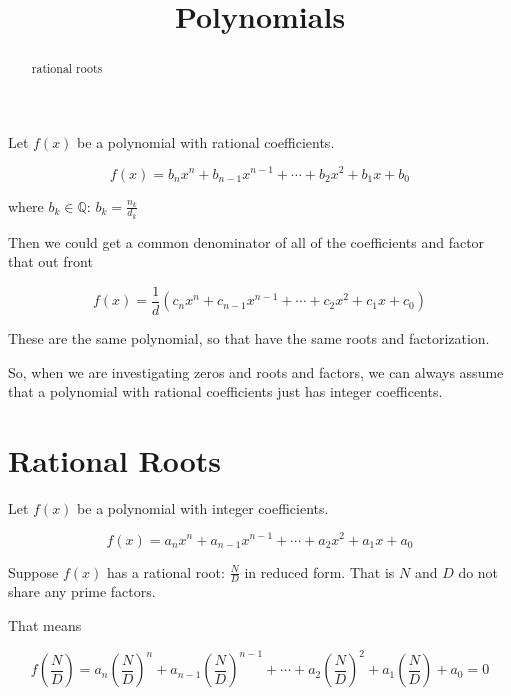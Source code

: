 \documentclass{ximera}
\title{Polynomials}
\begin{document}
\begin{abstract}
rational roots
\end{abstract}
\maketitle




Let $f(x)$ be a polynomial with rational coefficients.

\[   f(x) = b_n x^n + b_{n-1} x^{n-1} + \cdots + b_2 x^2 + b_1 x + b_0     \]


where $b_k \in \mathbb{Q}$:  $b_k = \frac{n_k}{d_k}$


Then we could get a common denominator of all of the coefficients and factor that out front



\[   f(x) = \frac{1}{d}(c_n x^n + c_{n-1} x^{n-1} + \cdots + c_2 x^2 + c_1 x + c_0)    \]


These are the same polynomial, so that have the same roots and factorization.


So, when we are investigating zeros and roots and factors, we can always assume that a polynomial with rational coefficients just has integer coefficents.




\section{Rational Roots}

Let $f(x)$ be a polynomial with integer coefficients.

\[   f(x) = a_n x^n + a_{n-1} x^{n-1} + \cdots + a_2 x^2 + a_1 x + a_0     \]


Suppose $f(x)$ has a rational root:  $\frac{N}{D}$ in reduced form.  That is $N$ and $D$ do not share any prime factors.



That means


\[    f \left( \frac{N}{D} \right) = a_n \left( \frac{N}{D} \right)^n + a_{n-1} \left( \frac{N}{D} \right)^{n-1} + \cdots + a_2 \left( \frac{N}{D} \right)^2 + a_1 \left( \frac{N}{D} \right) + a_0  = 0       \]
\end{document}
